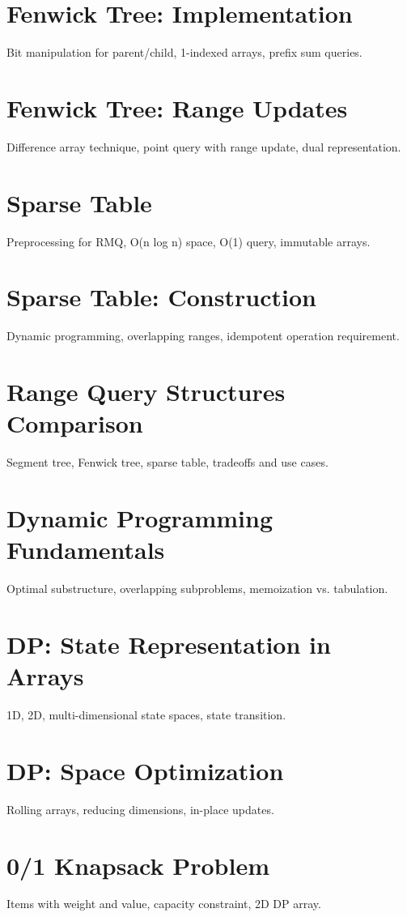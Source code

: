 \chapter{Fenwick Tree: Implementation}
Bit manipulation for parent/child, 1-indexed arrays, prefix sum queries.

\chapter{Fenwick Tree: Range Updates}
Difference array technique, point query with range update, dual representation.

\chapter{Sparse Table}
Preprocessing for RMQ, O(n log n) space, O(1) query, immutable arrays.

\chapter{Sparse Table: Construction}
Dynamic programming, overlapping ranges, idempotent operation requirement.

\chapter{Range Query Structures Comparison}
Segment tree, Fenwick tree, sparse table, tradeoffs and use cases.


\chapter{Dynamic Programming Fundamentals}
Optimal substructure, overlapping subproblems, memoization vs. tabulation.

\chapter{DP: State Representation in Arrays}
1D, 2D, multi-dimensional state spaces, state transition.

\chapter{DP: Space Optimization}
Rolling arrays, reducing dimensions, in-place updates.

\chapter{0/1 Knapsack Problem}
Items with weight and value, capacity constraint, 2D DP array.

